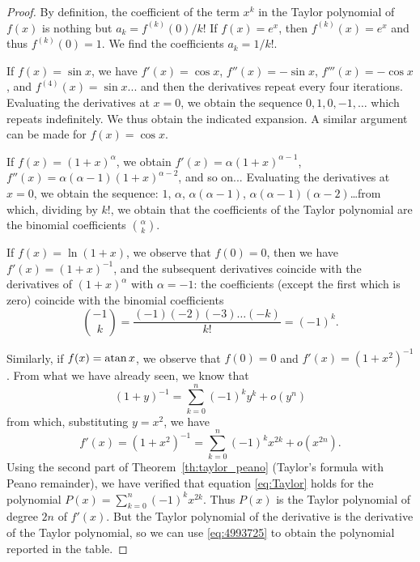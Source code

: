 %
\begin{proof}
\mymark{**}
By definition, the coefficient of the term $x^k$
in the Taylor polynomial of $f(x)$ is nothing but $a_k=f^{(k)}(0)/k!$
If $f(x) = e^x$, then $f^{(k)}(x) = e^x$ and thus $f^{(k)}(0) = 1$. We find the
coefficients $a_k = 1/k!$.

If $f(x) = \sin x$, we have $f'(x)=\cos x$, $f''(x) =-\sin x$, $f'''(x) = -\cos
x$, and $f^{(4)}(x) = \sin x$... and then the derivatives repeat every four
iterations. Evaluating the derivatives at $x=0$, we obtain the sequence $0, 1,
0, -1, \dots$ which repeats indefinitely. We thus obtain the indicated
expansion. A similar argument can be made for $f(x) = \cos x$.

If $f(x) = (1+x)^\alpha$, we obtain $f'(x) = \alpha (1+x)^{\alpha -1}$, $f''(x)
= \alpha (\alpha -1) (1+x)^{\alpha -2}$, and so on...
Evaluating the derivatives at $x=0$, we obtain the sequence: $1$, $\alpha$,
$\alpha(\alpha-1)$, $\alpha (\alpha-1)(\alpha -2)$\dots from which, dividing by
$k!$, we obtain that the coefficients of the Taylor polynomial are the binomial
coefficients ${\alpha \choose k}$.

If $f(x) = \ln (1+x)$, we observe that $f(0)=0$, then we have $f'(x) =
(1+x)^{-1}$, and the subsequent derivatives coincide with the derivatives of
$(1+x)^\alpha$ with $\alpha=-1$: the coefficients (except the first which is
zero) coincide with the binomial coefficients
\[
{-1 \choose k} = \frac{(-1)(-2)(-3) \dots (-k)}{k!} = (-1)^k.
\]

Similarly, if $f(x) = \operatorname{atan} x$, we observe that $f(0) = 0$ and $f'(x) =
(1+x^2)^{-1}$. From what we have already seen, we know that
\[
 (1+y)^{-1} = \sum_{k=0}^n (-1)^k y^k + o(y^n)
\]
from which, substituting $y=x^2$, we have
\[
 f'(x) = (1+x^2)^{-1} = \sum_{k=0}^n (-1)^k x^{2k} + o(x^{2n}).
\]
Using the second part of Theorem~\ref{th:taylor_peano} (Taylor's formula with
Peano remainder),
we have verified that equation \eqref{eq:Taylor} holds
for the polynomial $P(x) = \sum_{k=0}^n (-1)^k x^{2k}$.
Thus $P(x)$ is the Taylor polynomial of degree $2n$ of $f'(x)$.
But the Taylor polynomial of the derivative is the derivative of the Taylor
polynomial, so we can use \eqref{eq:4993725} to obtain
the polynomial reported in the table.


\end{proof}
